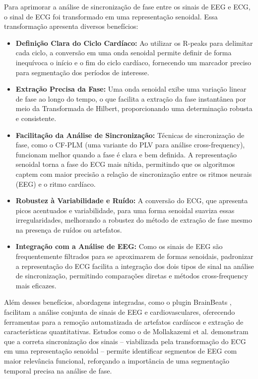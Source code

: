 Para aprimorar a análise de sincronização de fase entre os sinais de EEG e ECG, o sinal de ECG foi transformado em uma representação senoidal. Essa transformação apresenta diversos benefícios:
\begin{itemize}
    \item \textbf{Definição Clara do Ciclo Cardíaco:} Ao utilizar os R-peaks para delimitar cada ciclo, a conversão em uma onda senoidal permite definir de forma inequívoca o início e o fim do ciclo cardíaco, fornecendo um marcador preciso para segmentação dos períodos de interesse.
    \item \textbf{Extração Precisa da Fase:} Uma onda senoidal exibe uma variação linear de fase ao longo do tempo, o que facilita a extração da fase instantânea por meio da Transformada de Hilbert, proporcionando uma determinação robusta e consistente.
    \item \textbf{Facilitação da Análise de Sincronização:} Técnicas de sincronização de fase, como o CF-PLM (uma variante do PLV para análise cross-frequency), funcionam melhor quando a fase é clara e bem definida. A representação senoidal torna a fase do ECG mais nítida, permitindo que os algoritmos captem com maior precisão a relação de sincronização entre os ritmos neurais (EEG) e o ritmo cardíaco.
    \item \textbf{Robustez à Variabilidade e Ruído:} A conversão do ECG, que apresenta picos acentuados e variabilidade, para uma forma senoidal suaviza essas irregularidades, melhorando a robustez do método de extração de fase mesmo na presença de ruídos ou artefatos.
    \item \textbf{Integração com a Análise de EEG:} Como os sinais de EEG são frequentemente filtrados para se aproximarem de formas senoidais, padronizar a representação do ECG facilita a integração dos dois tipos de sinal na análise de sincronização, permitindo comparações diretas e métodos cross-frequency mais eficazes.
\end{itemize}

Além desses benefícios, abordagens integradas, como o plugin BrainBeats \cite{cannard2023brainbeats}, facilitam a análise conjunta de sinais de EEG e cardiovasculares, oferecendo ferramentas para a remoção automatizada de artefatos cardíacos e extração de características quantitativas. Estudos como o de Mollakazemi et al. \cite{mollakazemi2021eeg} demonstram que a correta sincronização dos sinais – viabilizada pela transformação do ECG em uma representação senoidal – permite identificar segmentos de EEG com maior relevância funcional, reforçando a importância de uma segmentação temporal precisa na análise de fase.

